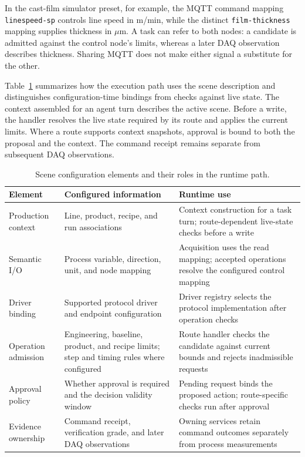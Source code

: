 In the cast-film simulator preset, for example, the MQTT command mapping
\texttt{linespeed-sp} controls line speed in m/min, while the distinct
\texttt{film-thickness} mapping supplies thickness in $\mu$m. A task can
refer to both nodes: a candidate is admitted against the control node's
limits, whereas a later DAQ observation describes thickness. Sharing MQTT does
not make either signal a substitute for the other.

Table~\ref{tab:scene-config} summarizes how the execution path uses the scene
description and distinguishes configuration-time bindings from checks against
live state. The context assembled for an agent turn describes the active scene. Before a
write, the handler resolves the live state required by its route and applies
the current limits. Where a route supports context snapshots, approval is
bound to both the proposal and the context. The command receipt remains
separate from subsequent DAQ observations.

\begin{table}[!t]
\centering
\caption{Scene configuration elements and their roles in the runtime path.}
\label{tab:scene-config}
\footnotesize
\setlength{\tabcolsep}{5pt}
\begin{tabularx}{\textwidth}{@{}>{\raggedright\arraybackslash}p{}>{\raggedright\arraybackslash}p{}X@{}}
\toprule
Element & Configured information & Runtime use\\
\midrule
Production context & Line, product, recipe, and run associations & Context construction for a task turn; route-dependent live-state checks before a write\\
Semantic I/O & Process variable, direction, unit, and node mapping & Acquisition uses the read mapping; accepted operations resolve the configured control mapping\\
Driver binding & Supported protocol driver and endpoint configuration & Driver registry selects the protocol implementation after operation checks\\
Operation admission & Engineering, baseline, product, and recipe limits; step and timing rules where configured & Route handler checks the candidate against current bounds and rejects inadmissible requests\\
Approval policy & Whether approval is required and the decision validity window & Pending request binds the proposed action; route-specific checks run after approval\\
Evidence ownership & Command receipt, verification grade, and later DAQ observations & Owning services retain command outcomes separately from process measurements\\
\bottomrule
\end{tabularx}
\end{table}

